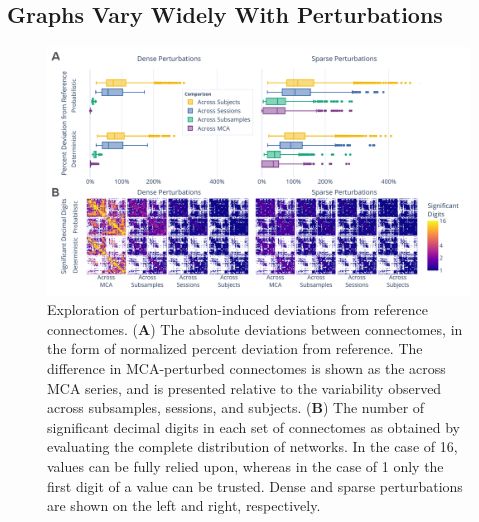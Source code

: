 \documentclass[fleqn,10pt]{SelfArx} %
\newcommand{\new}[1]{{#1}}
\begin{document}
\subsection*{Graphs Vary Widely With Perturbations}
\begin{figure}[hbt]\centering
\includegraphics[width=0.98\linewidth]{figures/fig1_absolute_differences.pdf}
\caption{Exploration of perturbation-induced deviations from reference connectomes.
(\textbf{A}) The absolute deviations \new{between connectomes}, in the form of normalized percent deviation from
reference. \new{The difference in MCA-perturbed connectomes is} shown as the across MCA series, \new{and is presented}
relative to \new{the variability observed} across subsamples, sessions, and subjects.
(\textbf{B}) The number of significant decimal digits in each set of connectomes as obtained \new{by} evaluating the
\new{complete distribution of networks}. In the case of 16, values can be fully relied upon, whereas in the case of 1 only the first
digit of a value can be trusted. \new{Dense} and \new{sparse} perturbations are shown on the left and right, respectively.}
\label{fig:absolute}
\end{figure}
\end{document}
